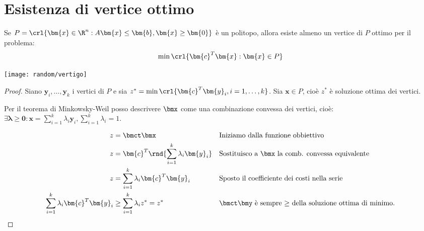 \documentclass[\main/main.tex]{subfiles}
\begin{document}
\section{Esistenza di vertice ottimo}

\begin{minipage}{\textwidth}
  \begin{minipage}{.83\textwidth}
    \flushleft
    \begin{theorem}
      Se $P = \crl{\bm{x} \in \R^n: A\bm{x} \leq \bm{b}, \bm{x} \geq \bm{0}}$ è un politopo, allora esiste almeno un vertice di $P$ ottimo per il problema:
      \[
        \min \crl{\bm{c}^T\bm{x}: \bm{x} \in P}
      \]
    \end{theorem}
  \end{minipage}\hfill
  \begin{minipage}{0.15\textwidth}\center
    \texttt{[image: random/vertigo]}
  \end{minipage}
\end{minipage}

\begin{proof}
  Siano $\bm{y}_i, \ldots, \bm{y}_k$ i vertici di $P$ e sia $z^* = \min \crl{\bm{c}^T\bm{y}_i, i=1,\ldots,k}$. Sia $\bm{x} \in P$, cioè $z^*$ è soluzione ottima dei vertici.

  Per il teorema di Minkowsky-Weil posso descrivere $\bmx$ come una combinazione convessa dei vertici, cioè: $\exists \bm{\lambda} \geq \bm{0}: \bm{x} = \sum_{i=1}^k \lambda_i \bm{y}_i, \sum_{i=1}^k \lambda_i =1$.

  \begin{align*}
    z                                       & = \bmct \bmx                                    &  & \text{Iniziamo dalla funzione obbiettivo}                             \\
    z                                       & = \bm{c}^T\rnd{\sum_{i=1}^k \lambda_i \bm{y}_i} &  & \text{Sostituisco a $\bmx$ la comb. convessa equivalente}             \\
    z                                       & = \sum_{i=1}^k \lambda_i \bm{c}^T\bm{y}_i       &  & \text{Sposto il coefficiente dei costi nella serie}                   \\
    \sum_{i=1}^k \lambda_i \bm{c}^T\bm{y}_i & \geq \sum_{i=1}^k  \lambda_i z^* = z^*          &  & \text{$\bmct \bmy$ è sempre $\geq$ della soluzione ottima di minimo.} \\
  \end{align*}
\end{proof}
\end{document}
